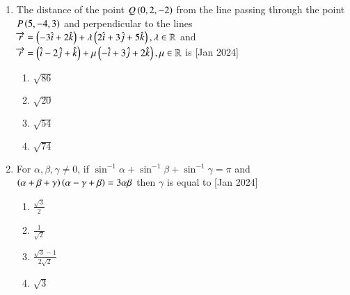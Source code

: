 \documentclass[journal]{IEEEtran}
\begin{document}
\begin{enumerate}
    \item The distance of the point $Q\left(0, 2, -2\right)$ from the line passing
    through the point $P\left(5, -4, 3\right)$ and perpendicular to the lines 
    $\overrightarrow{r} = \left(-3\hat{i} + 2\hat{k}\right) + \lambda\left(2\hat{i} + 3\hat{j} + 5\hat{k}\right), \lambda \in \mathbb{R}$
    and $\overrightarrow{r} = \left(\hat{i} - 2\hat{j} + \hat{k}\right) + \mu\left(-\hat{i} + 3\hat{j} + 2\hat{k}\right), \mu \in \mathbb{R}$
    is
    \hfill{[Jan 2024]}

    \begin{multicols}{4}
\begin{enumerate}

        \item $\sqrt{86}$
        \item $\sqrt{20}$
        \item $\sqrt{54}$
        \item $\sqrt{74}$
    \end{enumerate}
\end{multicols}

    \item For $\alpha, \beta, \gamma \ne 0$, if $\sin^{-1}\alpha + \sin^{-1}\beta + \sin^{-1}\gamma = \pi$
        and $\left(\alpha+\beta+\gamma\right)\left(\alpha-\gamma+\beta\right) = 3\alpha\beta$ then $\gamma$ is
    equal to
    \hfill{[Jan 2024]}

    \begin{multicols}{4}
\begin{enumerate}

        \item $\frac{\sqrt{3}}{2}$
        \item $\frac{1}{\sqrt{2}}$
        \item $\frac{\sqrt{3} - 1}{2\sqrt{2}}$
        \item $\sqrt{3}$
    \end{enumerate}
\end{multicols}
\end{enumerate}
\end{document}
